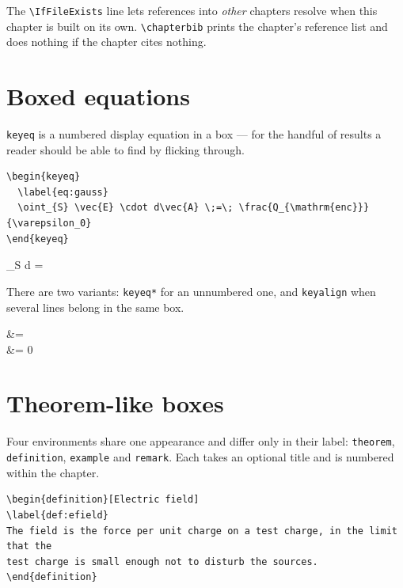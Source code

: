 \noindent
The \verb|\IfFileExists| line lets references into \emph{other} chapters
resolve when this chapter is built on its own. \verb|\chapterbib| prints the
chapter's reference list and does nothing if the chapter cites nothing.

\section{Boxed equations}

\verb|keyeq| is a numbered display equation in a box --- for the handful of
results a reader should be able to find by flicking through.

\begin{verbatim}
\begin{keyeq}
  \label{eq:gauss}
  \oint_{S} \vec{E} \cdot d\vec{A} \;=\; \frac{Q_{\mathrm{enc}}}{\varepsilon_0}
\end{keyeq}
\end{verbatim}

\begin{keyeq}
  \label{eq:gauss}
  \oint_{S}  \cdot d \;=\; 
\end{keyeq}

\noindent
There are two variants: \verb|keyeq*| for an unnumbered one, and
\verb|keyalign| when several lines belong in the same box.

\begin{keyalign}
  \nabla \cdot {} &=  \\
  \nabla \cdot {} &= 0
\end{keyalign}

\section{Theorem-like boxes}

Four environments share one appearance and differ only in their label:
\verb|theorem|, \verb|definition|, \verb|example| and \verb|remark|. Each takes
an optional title and is numbered within the chapter.

\begin{verbatim}
\begin{definition}[Electric field]
\label{def:efield}
The field is the force per unit charge on a test charge, in the limit that the
test charge is small enough not to disturb the sources.
\end{definition}
\end{verbatim}

